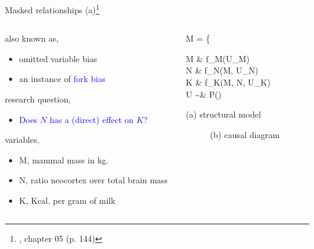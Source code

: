 \begin{frame}
	{Masked relationships (a)\footnote{\citet{McElreath_2020}, chapter 05 (p. 144)}}
	\begin{columns}
		\begin{column}{0.5\textwidth}
			also known as,
			\begin{itemize}
				\item omitted variable bias
				\item an instance of \textcolor{blue}{fork bias}
			\end{itemize}
			
			research question, 
			\begin{itemize}
				\item \textcolor{blue}{Does $N$ has a (direct) effect on $K$?}
			\end{itemize}
			
			variables,
			\begin{itemize}
				\item M, mammal mass in kg.
				\item N, ratio neocortex over total brain mass
				\item K, Kcal. per gram of milk
			\end{itemize}
		\end{column}
		\begin{column}{0.5\textwidth}  
			\begin{equ}
				M = \left\{ \begin{aligned} 
					M \leftarrow & \; f_{M}(U_{M}) \\
					N \leftarrow & \; f_{N}(M, U_{N}) \\
					K \leftarrow & \; f_{K}(M, N, U_{K}) \\
					U \sim & \; P()
				\end{aligned} \right
				\caption*{(a) structural model}
			\end{equ}
			\begin{figure}
				\caption*{(b) causal diagram}
			\end{figure}
		\end{column}
	\end{columns}
\end{frame}
